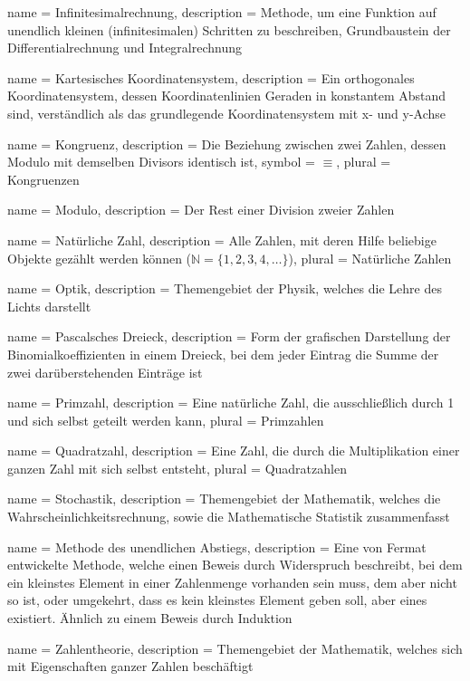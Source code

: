 {
    name = Infinitesimalrechnung,
    description = {Methode, um eine Funktion auf unendlich kleinen (infinitesimalen) Schritten zu beschreiben, Grundbaustein der \Gls{Differentialrechnung} und \Gls{Integralrechnung}}
}

{
    name = Kartesisches Koordinatensystem,
    description = {Ein orthogonales Koordinatensystem, dessen Koordinatenlinien Geraden in konstantem Abstand sind, verständlich als das grundlegende Koordinatensystem mit x- und y-Achse}
}

{
    name = Kongruenz,
    description = {Die Beziehung zwischen zwei Zahlen, dessen \Gls{Modulo} mit demselben Divisors identisch ist},
    symbol = {\ensuremath{\equiv}},
    plural = {Kongruenzen}
}

{
    name = Modulo,
    description = {Der Rest einer Division zweier Zahlen}
}

{
    name = Natürliche Zahl,
    description = {Alle Zahlen, mit deren Hilfe beliebige Objekte gezählt werden können ($\mathbb{N} = \{ 1,2,3,4, \dots \}$)},
    plural = {Natürliche Zahlen}
}

{
    name = Optik,
    description = {Themengebiet der Physik, welches die Lehre des Lichts darstellt}
}

{
    name = Pascalsches Dreieck,
    description = {Form der grafischen Darstellung der Binomialkoeffizienten in einem Dreieck, bei dem jeder Eintrag die Summe der zwei darüberstehenden Einträge ist}
}

{
    name = Primzahl,
    description = {Eine natürliche Zahl, die ausschließlich durch 1 und sich selbst geteilt werden kann},
    plural = {Primzahlen}
}

{
    name = Quadratzahl,
    description = {Eine Zahl, die durch die Multiplikation einer ganzen Zahl mit sich selbst entsteht},
    plural = {Quadratzahlen}
}

{
    name = Stochastik,
    description = {Themengebiet der Mathematik, welches die Wahrscheinlichkeitsrechnung, sowie die Mathematische Statistik zusammenfasst}
}

{
    name = Methode des unendlichen Abstiegs,
    description = {Eine von Fermat entwickelte Methode, welche einen Beweis durch Widerspruch beschreibt, bei dem ein kleinstes Element in einer Zahlenmenge vorhanden sein muss, dem aber nicht so ist, oder umgekehrt, dass es kein kleinstes Element geben soll, aber eines existiert. Ähnlich zu einem Beweis durch Induktion}
}

{
    name = Zahlentheorie,
    description = {Themengebiet der Mathematik, welches sich mit Eigenschaften ganzer Zahlen beschäftigt}
}